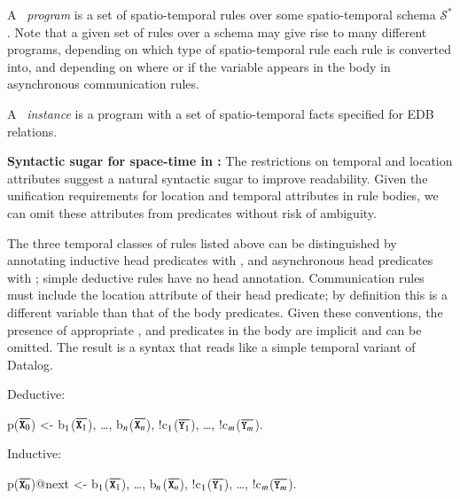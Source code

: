 A \lang\ {\em program} is a set of spatio-temporal rules over some spatio-temporal schema $\mathcal{S}^*$.  Note that a given set of rules over a schema may give rise to many different \lang programs, depending on which type of spatio-temporal rule each rule is converted into, and depending on where or if the variable  appears in the body in asynchronous communication rules. 

A \lang\ {\em instance} is a program with a set of spatio-temporal facts specified for EDB relations.

\noindent
\textbf{Syntactic sugar for space-time in \lang:}
The restrictions on temporal and location attributes suggest a natural syntactic sugar to improve readability.  Given the unification requirements for location and temporal attributes in rule bodies, we can omit these attributes from predicates without risk of ambiguity.  

The three temporal classes of rules listed above can be distinguished by annotating inductive head predicates with , and asynchronous head predicates with ; simple deductive rules have no head annotation. 
Communication rules must include the location attribute of their head predicate; by definition this is a different variable than that of the body predicates.
 Given these conventions, the presence of appropriate ,  and  predicates in the body are implicit and can be omitted.  The result is a syntax that reads like a simple temporal variant of Datalog.

Deductive:

\begin{Dedalus}
p(\(\overline{\dedalus{X}\sb{0}}\)) <- b\(\sb{1}\)(\(\overline{\dedalus{X}\sb{1}}\)), \ldots, b\(\sb{n}\)(\(\overline{\dedalus{X}\sb{n}}\)),
!c\(\sb{1}\)(\(\overline{\dedalus{Y}\sb{1}}\)), \ldots, !c\(\sb{m}\)(\(\overline{\dedalus{Y}\sb{m}}\)).
\end{Dedalus}

Inductive:

\begin{Dedalus}
p(\(\overline{\dedalus{X}\sb{0}}\))@next <- b\(\sb{1}\)(\(\overline{\dedalus{X}\sb{1}}\)), \ldots, b\(\sb{n}\)(\(\overline{\dedalus{X}\sb{n}}\)),
!c\(\sb{1}\)(\(\overline{\dedalus{Y}\sb{1}}\)), \ldots, !c\(\sb{m}\)(\(\overline{\dedalus{Y}\sb{m}}\)).
\end{Dedalus}

